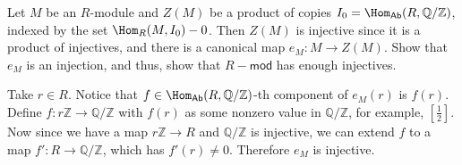 \begin{exer} Let $M$ be an $R$-module and $Z(M)$ be a product of copies $I_0=\Hom_{\mathsf{Ab}}(R,\mathbb{Q}/\mathbb{Z})$, indexed by the set $\Hom_R(M,I_0)-0$. Then $Z(M)$ is injective since it is a product of injectives, and there is a canonical map $e_M:M\rightarrow Z(M)$. Show that $e_M$ is an injection, and thus, show that $R-\mathsf{mod}$ has enough injectives.
\end{exer}
\begin{solution} Take $r\in R$. Notice that $f\in \Hom_{\mathsf{Ab}}(R,\mathbb{Q}/\mathbb{Z})$-th component of $e_M(r)$ is $f(r)$. Define $f:r\mathbb{Z}\rightarrow \mathbb{Q}/\mathbb{Z}$ with $f(r)$ as some nonzero value in $\mathbb{Q}/\mathbb{Z}$, for example, $\left[\frac{1}{2}\right]$. Now since we have a map $r\mathbb{Z}\rightarrow R$ and $\mathbb{Q}/\mathbb{Z}$ is injective, we can extend $f$ to a map $f':R\rightarrow \mathbb{Q}/\mathbb{Z}$, which has $f'(r)\neq 0$. Therefore $e_M$ is injective.
\end{solution}

